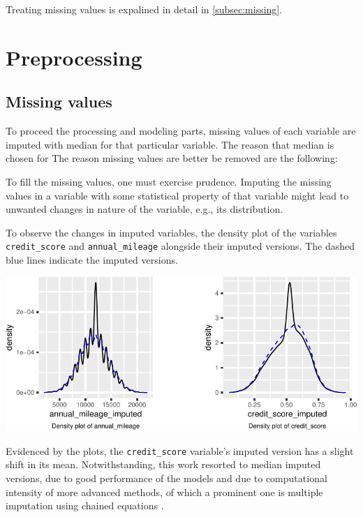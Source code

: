 \documentclass{article}
\begin{document}
Treating missing values is expalined in detail in \ref{subsec:missing}.

\hypertarget{preprocessing}{%
\section{\texorpdfstring{Preprocessing
\label{sec:process}}{Preprocessing }}\label{preprocessing}}

\hypertarget{missing-values}{%
\subsection{\texorpdfstring{Missing values
\label{subsec:missing}}{Missing values }}\label{missing-values}}

To proceed the processing and modeling parts, missing values of each
variable are imputed with median for that particular variable. The
reason that median is chosen for The reason missing values are better be
removed are the following:

To fill the missing values, one must exercise prudence. Imputing the
missing values in a variable with some statistical property of that
variable might lead to unwanted changes in nature of the variable, e.g.,
its distribution.

To observe the changes in imputed variables, the density plot of the
variables \texttt{credit\_score} and \texttt{annual\_mileage} alongside
their imputed versions. The dashed blue lines indicate the imputed
versions.

\begin{center}\includegraphics{report_files/figure-latex/unnamed-chunk-7-1} \end{center}

Evidenced by the plots, the \texttt{credit\_score} variable's imputed
version has a slight shift in its mean. Notwithstanding, this work
resorted to median imputed versions, due to good performance of the
models and due to computational intensity of more advanced methods, of
which a prominent one is multiple imputation using chained equations
\cite{mice}.
\end{document}

